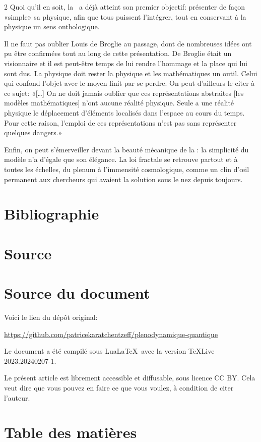 \begin{multicols}{2}
Quoi qu'il en soit, la \PQ\ a déjà atteint son premier objectif:
présenter de façon «simple» sa physique, afin que tous puissent
l'intégrer, tout en conservant à la physique un sens onthologique.

Il ne faut pas oublier Louis de Broglie au passage, dont de nombreuses
idées ont pu être confirmées tout au long de cette présentation. De
Broglie était un visionnaire et il est peut-être temps de lui rendre
l'hommage et la place qui lui sont dus. La physique doit rester la
physique et les mathématiques un outil. Celui qui confond l'objet avec
le moyen finit par se perdre. On peut d'ailleurs le citer à ce sujet: «[\ldots] On ne doit jamais oublier que ces représentations abstraites [les modèles mathématiques] n'ont aucune réalité physique. Seule a une réalité physique le déplacement d'éléments localisés dans l'espace au cours du temps. Pour cette raison, l'emploi de ces représentations n'est pas sans représenter quelques dangers.» \cite{debroglie1976physique}

Enfin, on peut s'émerveiller devant la beauté mécanique de la \PQ: la
simplicité du modèle n'a d'égale que son élégance. La loi fractale se
retrouve partout et à toutes les échelles, du plenum à l'immensité
cosmologique, comme un clin d'œil permanent aux chercheurs qui
avaient la solution sous le nez depuis toujours. 



\section{Bibliographie}

	
\printbibliography

\section{Source}

\section*{S\MakeLowercase{ource du document}}

\medskip

Voici le lien du dépôt original:

\url{https://github.com/patricekaratchentzeff/plenodynamique-quantique}
\medskip

Le document a été compilé sous Lua\LaTeX\ avec la version \TeX Live 2023.20240207-1.

Le présent article est librement accessible et diffusable, sous licence CC BY. Cela veut dire que vous pouvez en faire ce que vous voulez, à condition de citer l'auteur.

\section{Table des matières}

\tableofcontents
\listoffigures
\listoftables

\end{multicols}


